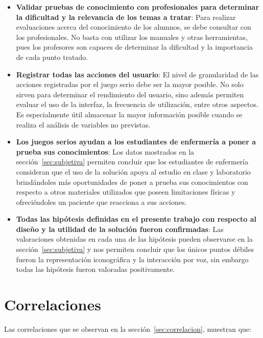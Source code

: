\begin{itemize}

\item \textbf{Validar pruebas de conocimiento con profesionales para determinar la
        dificultad y la relevancia de los temas a tratar}: Para realizar
    evaluaciones acerca del conocimiento de los alumnos, se debe consultar con
    los profesionales. No basta con utilizar los manuales y otras herramientas,
    pues los profesores son capaces de determinar la dificultad y la importancia
    de cada punto tratado.

\item \textbf{Registrar todas las acciones del usuario}: El nivel de
    granularidad de las acciones registradas por el juego serio debe ser la
    mayor posible. No solo sirven para determinar el rendimiento del usuario,
    sino además permiten evaluar el uso de la interfaz, la frecuencia de
    utilización, entre otros aspectos. Es especialmente útil almacenar la mayor
    información posible cuando se realiza el análisis de variables no previstas.

\item \textbf{Los juegos serios ayudan a los estudiantes de enfermería a poner a
        prueba sus conocimientos}: Los datos mostrados en la
    sección~\ref{sec:subjetiva} permiten concluir que los estudiantes de
    enfermería consideran que el uso de la solución apoya al estudio en clase y
    laboratorio brindándoles más oportunidades de poner a prueba sus
    conocimientos con respecto a otros materiales utilizados que poseen
    limitaciones físicas y ofreciéndoles un paciente que reacciona a sus
    acciones. 

\item \textbf{Todas las hipótesis definidas en el presente trabajo con respecto
        al diseño y la utilidad de la solución fueron confirmadas}: Las
    valoraciones obtenidas en cada una de las hipótesis pueden observarse en la
    sección~\ref{sec:subjetiva} y nos permiten concluir que los únicos puntos
    débiles fueron la representación iconográfica y la interacción por voz, sin
    embargo todas las hipótesis fueron valoradas positivamente.

\end{itemize}

\section{Correlaciones}

Las correlaciones que se observan en la sección~\ref{sec:correlacion}, muestran
que:

